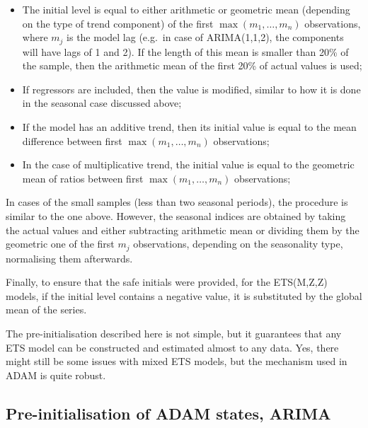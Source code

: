 \documentclass[]{book}
\providecommand{\tightlist}{%
  \setlength{\itemsep}{0pt}\setlength{\parskip}{0pt}}
\theoremstyle{definition}
\theoremstyle{definition}
\theoremstyle{definition}
\theoremstyle{definition}
\theoremstyle{remark}
\begin{document}
\begin{itemize}
\tightlist
\item
  The initial level is equal to either arithmetic or geometric mean (depending on the type of trend component) of the first \(\max(m_1,\dots,m_n)\) observations, where \(m_j\) is the model lag (e.g.~in case of ARIMA(1,1,2), the components will have lags of 1 and 2). If the length of this mean is smaller than 20\% of the sample, then the arithmetic mean of the first 20\% of actual values is used;
\item
  If regressors are included, then the value is modified, similar to how it is done in the seasonal case discussed above;
\item
  If the model has an additive trend, then its initial value is equal to the mean difference between first \(\max(m_1,\dots,m_n)\) observations;
\item
  In the case of multiplicative trend, the initial value is equal to the geometric mean of ratios between first \(\max(m_1,\dots,m_n)\) observations;
\end{itemize}

In cases of the small samples (less than two seasonal periods), the procedure is similar to the one above. However, the seasonal indices are obtained by taking the actual values and either subtracting arithmetic mean or dividing them by the geometric one of the first \(m_j\) observations, depending on the seasonality type, normalising them afterwards.

Finally, to ensure that the safe initials were provided, for the ETS(M,Z,Z) models, if the initial level contains a negative value, it is substituted by the global mean of the series.

The pre-initialisation described here is not simple, but it guarantees that any ETS model can be constructed and estimated almost to any data. Yes, there might still be some issues with mixed ETS models, but the mechanism used in ADAM is quite robust.

\hypertarget{pre-initialisation-of-adam-states-arima}{%
\subsection{Pre-initialisation of ADAM states, ARIMA}\label{pre-initialisation-of-adam-states-arima}}
\end{document}
